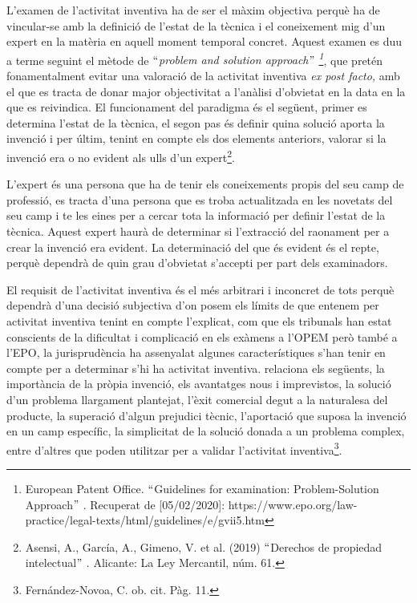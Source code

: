 \documentclass[12pt]{article}
\renewcommand{\_}{\kern-1.5pt\textunderscore\kern-1.5pt}
\begin{document}
\begin{itemize}
\vspace{\baselineskip}
L’examen de l’activitat inventiva ha de ser el màxim objectiva perquè ha de vincular-se amb la definició de l’estat de la tècnica i el coneixement mig d’un expert en la matèria en aquell moment temporal concret. Aquest examen es duu a terme seguint el mètode de $``$\textit{problem and solution approach$"$ \footnote{ European Patent Office. $``$Guidelines for examination: Problem-Solution Approach$"$ . Recuperat de [05/02/2020]: https://www.epo.org/law-practice/legal-texts/html/guidelines/e/g\_vii\_5.htm }}, que pretén fonamentalment evitar una valoració de la activitat inventiva \textit{ex post facto, }amb el que es tracta de donar major objectivitat a l’anàlisi d’obvietat en la data en la que es reivindica. El funcionament del paradigma és el següent, primer es determina l’estat de la tècnica, el segon pas és definir quina solució aporta la invenció i per últim, tenint en compte els dos elements anteriors, valorar si la invenció era o no evident als ulls d’un expert\footnote{ Asensi, A., García, A., Gimeno, V. et al. (2019) $``$Derechos de propiedad intelectual$"$ . Alicante: La Ley Mercantil, núm. 61. }. \par


\vspace{\baselineskip}
L’expert és una persona que ha de tenir els coneixements propis del seu camp de professió, es tracta d’una persona que es troba actualitzada en les novetats del seu camp i te les eines per a cercar tota la informació per definir l’estat de la tècnica. Aquest expert haurà de determinar si l’extracció del raonament per a crear la invenció era evident. La determinació del que és evident és el repte, perquè dependrà de quin grau d’obvietat s’accepti per part dels examinadors.  \par


\vspace{\baselineskip}
El requisit de l’activitat inventiva és el més arbitrari i inconcret de tots perquè dependrà d’una decisió subjectiva d’on posem els límits de que entenem per activitat inventiva tenint en compte l’explicat, com que els tribunals han estat conscients de la dificultat i complicació en els exàmens a l’OPEM però també a l’EPO, la jurisprudència ha assenyalat algunes característiques s’han tenir en compte per a determinar s’hi ha activitat inventiva. relaciona els següents, la importància de la pròpia invenció, els avantatges nous  i imprevistos, la solució d’un problema llargament plantejat, l’èxit comercial degut a la naturalesa del producte, la superació d’algun prejudici tècnic, l’aportació que suposa la invenció en un camp específic, la simplicitat de la solució donada a un problema complex, entre d’altres que poden utilitzar per a validar l’activitat inventiva\footnote{Fernández-Novoa, C. ob. cit. Pàg. 11. }. \par



\end{itemize}
\end{document}
